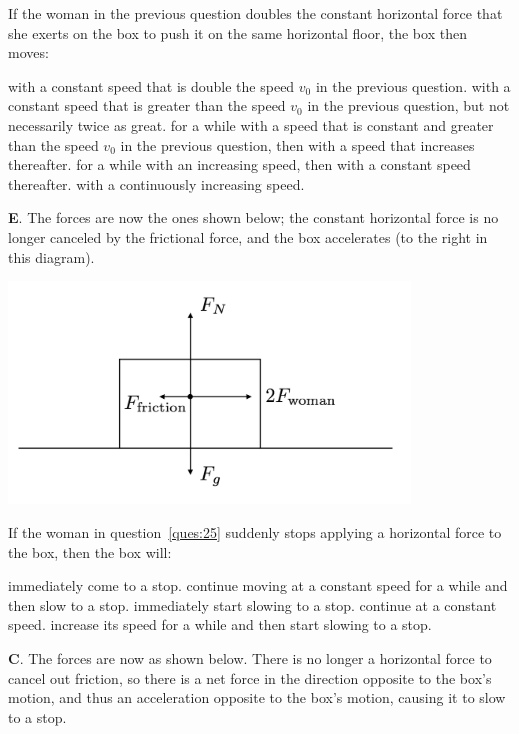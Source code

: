 \documentclass[12pt]{exam}
\begin{document}
\begin{questions}
\question
If the woman in the previous question doubles the constant horizontal force that she exerts on the box to push it on the same horizontal floor, the box then moves:
\begin{choices}
\choice with a constant speed that is double the speed $v_0$ in the previous question.
\choice with a constant speed that is greater than the speed $v_0$ in the previous question, but not necessarily twice as great.
\choice for a while with a speed that is constant and greater than the speed $v_0$ in the previous question, then with a speed that increases thereafter.
\choice for a while with an increasing speed, then with a constant speed thereafter.
\choice with a continuously increasing speed.
\end{choices}
\begin{TheSolution}
\textbf{E}. The forces are now the ones shown below; the constant horizontal force is no longer canceled by the frictional force, and the box accelerates (to the right in this diagram).

\begin{center}
\includegraphics[width=0.8\textwidth]{../images/test1_box2.png}
\end{center}
\end{TheSolution}

\question
If the woman in question~\ref{ques:25} suddenly stops applying a horizontal force to the box, then the box will:
\begin{choices}
\choice immediately come to a stop.
\choice continue moving at a constant speed for a while and then slow to a stop.
\choice immediately start slowing to a stop.
\choice continue at a constant speed.
\choice increase its speed for a while and then start slowing to a stop.
\end{choices}
\begin{TheSolution}
\textbf{C}. The forces are now as shown below. There is no longer a horizontal force to cancel out friction, so there is a net force in the direction opposite to the box's motion, and thus an acceleration opposite to the box's motion, causing it to slow to a stop.


\end{TheSolution}
\end{questions}
\end{document}
